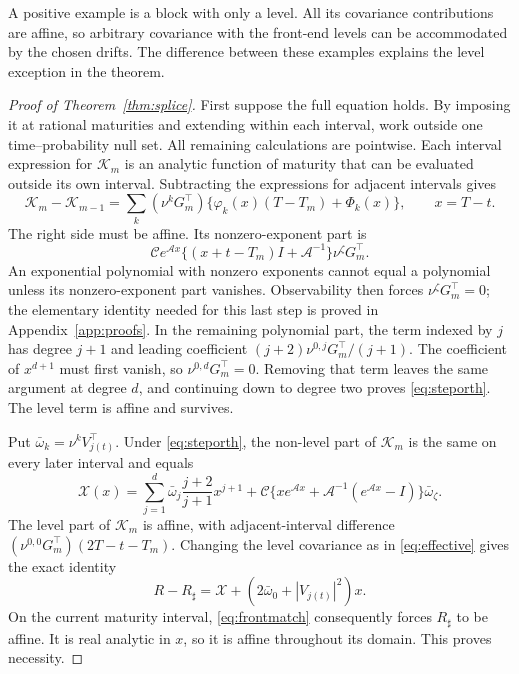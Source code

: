 A positive example is a block with only a level. All its covariance contributions are affine, so arbitrary covariance with the front-end levels can be accommodated by the chosen drifts. The difference between these examples explains the level exception in the theorem.

\begin{proof}[Proof of Theorem~\ref{thm:splice}]
First suppose the full equation holds. By imposing it at rational maturities and extending within each interval, work outside one time--probability null set. All remaining calculations are pointwise. Each interval expression for $\mathcal K_m$ is an analytic function of maturity that can be evaluated outside its own interval. Subtracting the expressions for adjacent intervals gives
\begin{equation}
\mathcal K_m-\mathcal K_{m-1}=\sum_k(\nu^kG_m^\top)
 \{\varphi_k(x)(T-T_m)+\Phi_k(x)\},\qquad x=T-t.\label{eq:crossjump}
\end{equation}
The right side must be affine. Its nonzero-exponent part is
\[
\mathcal C e^{\mathcal A x}\{(x+t-T_m)I+\mathcal A^{-1}\}\nu^\zeta G_m^\top.
\]
An exponential polynomial with nonzero exponents cannot equal a polynomial unless its nonzero-exponent part vanishes. Observability then forces $\nu^\zeta G_m^\top=0$; the elementary identity needed for this last step is proved in Appendix~\ref{app:proofs}. In the remaining polynomial part, the term indexed by $j$ has degree $j+1$ and leading coefficient $(j+2)\nu^{0,j}G_m^\top/(j+1)$. The coefficient of $x^{d+1}$ must first vanish, so $\nu^{0,d}G_m^\top=0$. Removing that term leaves the same argument at degree $d$, and continuing down to degree two proves \eqref{eq:steporth}. The level term is affine and survives.

Put $\bar\omega_k=\nu^kV_{j(t)}^\top$. Under \eqref{eq:steporth}, the non-level part of $\mathcal K_m$ is the same on every later interval and equals
\begin{equation}
\mathcal X(x)=\sum_{j=1}^d\bar\omega_j\frac{j+2}{j+1}x^{j+1}
 +\mathcal C\{x e^{\mathcal A x}+\mathcal A^{-1}(e^{\mathcal A x}-I)\}\bar\omega_\zeta.
\label{eq:crosscommon}
\end{equation}
The level part of $\mathcal K_m$ is affine, with adjacent-interval difference
$(\nu^{0,0}G_m^\top)(2T-t-T_m)$. Changing the level covariance as in \eqref{eq:effective} gives the exact identity
\begin{equation}
R-R_\sharp=\mathcal X+(2\bar\omega_0+|V_{j(t)}|^2)x.\label{eq:effectiveidentity}
\end{equation}
On the current maturity interval, \eqref{eq:frontmatch} consequently forces $R_\sharp$ to be affine. It is real analytic in $x$, so it is affine throughout its domain. This proves necessity.


\end{proof}
